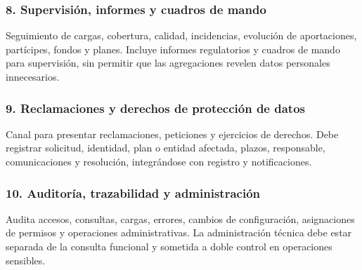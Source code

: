 \documentclass[11pt,a4paper]{article}
\begin{document}
\subsubsection{8. Supervisión, informes y cuadros de mando}
Seguimiento de cargas, cobertura, calidad, incidencias, evolución de aportaciones, partícipes, fondos y planes. Incluye informes regulatorios y cuadros de mando para supervisión, sin permitir que las agregaciones revelen datos personales innecesarios.

\subsubsection{9. Reclamaciones y derechos de protección de datos}
Canal para presentar reclamaciones, peticiones y ejercicios de derechos. Debe registrar solicitud, identidad, plan o entidad afectada, plazos, responsable, comunicaciones y resolución, integrándose con registro y notificaciones.

\subsubsection{10. Auditoría, trazabilidad y administración}
Audita accesos, consultas, cargas, errores, cambios de configuración, asignaciones de permisos y operaciones administrativas. La administración técnica debe estar separada de la consulta funcional y sometida a doble control en operaciones sensibles.
\end{document}
